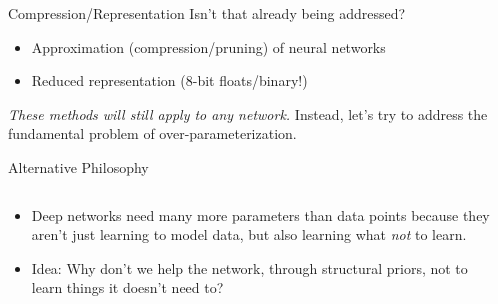 \documentclass[t,xcolor=dvipsnames]{beamer}
\begin{document}
\begin{frame}{Compression/Representation}
Isn't that already being addressed?
\begin{itemize}
\item Approximation (compression/pruning) of neural networks
\item Reduced representation (8-bit floats/binary!)
\end{itemize}
\vfill
\textit{These methods will still apply to any network.} Instead, let's try to  address the fundamental problem of over-parameterization.
\end{frame}
\begin{frame}{Alternative Philosophy}
\begin{columns}[onlytextwidth,T]
\begin{column}{0.65\textwidth}
\begin{itemize}
    \item Deep networks need many more parameters than data points because they aren't just learning to model data, but also learning what \emph{\color{blue}not} to learn. 
    \item Idea: Why don't we help the network, through structural priors, not to learn things it doesn't need to?
\end{itemize}
\end{column}
\begin{column}{0.34\textwidth}

\end{column}
\end{columns}
\end{frame}
\end{document}
